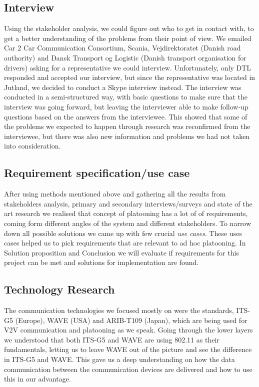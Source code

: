 \subsection{Interview}
Using the stakeholder analysis, we could figure out who to get in contact with, to get a better understanding of the problems from their point of view. We emailed Car 2 Car Communication Consortium, Scania, Vejdirektoratet (Danish road authority) and Dansk Transport og Logistic (Danish transport organisation for drivers) asking for a representative we could interview.
Unfortunately, only DTL responded and accepted our interview, but since the representative was located in Jutland, we decided to conduct a Skype interview instead. The interview was conducted in a semi-structured way, with basic questions to make sure that the interview was going forward, but leaving the interviewer able to make follow-up questions based on the answers from the interviewee. This showed that some of the problems we expected to happen through research was reconfirmed from the interviewee, but there was also new information and problems we had not taken into consideration.
% 
\subsection{Requirement specification/use case}
After using methods mentioned above and gathering all the results from stakeholders analysis, primary and secondary interviews/surveys and state of the art research we realised that concept of platooning has a lot of of requirements, coming form different angles of the system and different stakeholders. To narrow down all possible solutions we came up with few crucial \emph{use cases}. These uses cases helped us to pick requirements that are relevant to ad hoc platooning. In Solution proposition and Conclusion we will evaluate if requirements for this project can be met and solutions for implementation are found.
% 
\subsection{Technology Research}
The communication technologies we focused mostly on were the standards, ITS-G5 (Europe), WAVE (USA) and ARIB-T109 (Japan), which are being used for V2V communication and platooning as we speak. Going through the lower layers we understood that both ITS-G5 and WAVE are using 802.11 as their fundamentals, letting us to leave WAVE out of the picture and see the difference in ITS-G5 and WAVE. This gave us a deep understanding on how the data communication between the communication devices are delivered and how to use this in our advantage.

